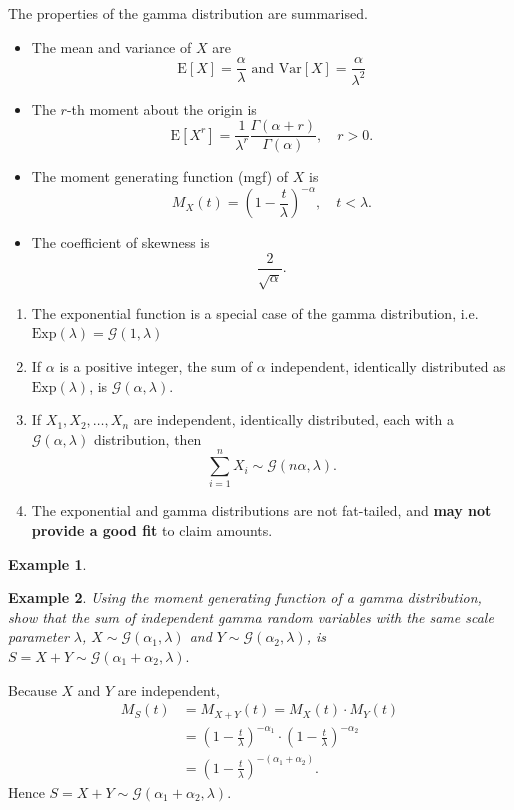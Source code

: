 \documentclass[
]{book}
\theoremstyle{definition}
\theoremstyle{definition}
\newtheorem{example}{Example}[chapter]
\theoremstyle{definition}
\theoremstyle{definition}
\theoremstyle{remark}
\begin{document}
The properties of the gamma distribution are summarised.

\begin{itemize}
\item
  The mean and variance of \(X\) are
  \[\mathrm{E}[X] = \frac{\alpha}{\lambda} \text{ and } \mathrm{Var}[X] =\frac{\alpha}{\lambda^2}\]
\item
  The \(r\)-th moment about the origin is
  \[\mathrm{E}[X^r] = \frac{1}{\lambda^r} \frac{\Gamma(\alpha + r)}{\Gamma(\alpha )}, \quad r > 0.\]
\item
  The moment generating function (mgf) of \(X\) is
  \[M_X(t) = \left(1 -  \frac{t}{\lambda}\right)^{-\alpha}, \quad t < \lambda.\]
\item
  The coefficient of skewness is \[\frac{2}{\sqrt{\alpha}}.\]
\end{itemize}

\begin{enumerate}
\def\labelenumi{\arabic{enumi}.}
\item
  The exponential function is a special case of the gamma
  distribution, i.e.~\(\text{Exp}(\lambda)= \mathcal{G}(1,\lambda)\)
\item
  If \(\alpha\) is a positive integer, the sum of \(\alpha\) independent,
  identically distributed as \(\text{Exp}(\lambda)\), is
  \(\mathcal{G}(\alpha, \lambda)\).
\item
  If \(X_1, X_2, \ldots, X_n\) are independent, identically distributed,
  each with a \(\mathcal{G}(\alpha, \lambda)\) distribution, then
  \[\sum_{i = 1}^n X_i \sim \mathcal{G}(n\alpha, \lambda).\]
\item
  The exponential and gamma distributions are not fat-tailed, and
  \textbf{may not provide a good fit} to claim amounts.
\end{enumerate}

\begin{example}
\protect\hypertarget{exm:unlabeled-div-29}{}\label{exm:unlabeled-div-29}

\textbf{Example 2}. \emph{Using the moment generating function of a gamma
distribution, show that the sum of independent gamma random variables
with the same scale parameter \(\lambda\),
\(X \sim \mathcal{G}(\alpha_1, \lambda)\) and
\(Y \sim \mathcal{G}(\alpha_2, \lambda)\), is
\(S = X+ Y \sim \mathcal{G}(\alpha_1 + \alpha_2, \lambda).\)}

\end{example}

Because \(X\) and \(Y\) are independent, \[\begin{aligned}
    M_S(t) &= M_{X+Y}(t) = M_X(t) \cdot M_Y(t)\\
        &= (1 - \frac{t}{\lambda})^{-\alpha_1} \cdot (1 - \frac{t}{\lambda})^{-\alpha_2}     \\
        &=  (1 - \frac{t}{\lambda})^{-(\alpha_1 + \alpha_2)}. \end{aligned}\]
Hence \(S = X + Y \sim \mathcal{G}(\alpha_1 + \alpha_2, \lambda).\)
\end{document}
